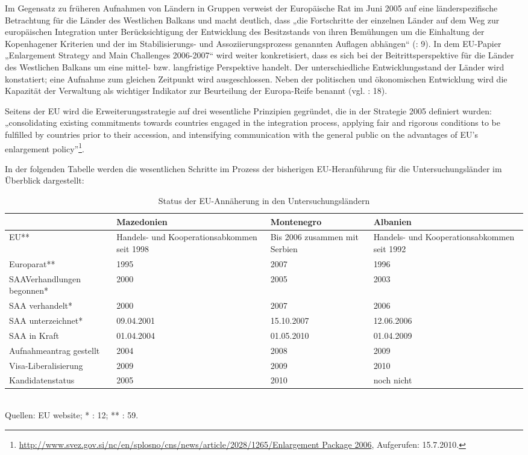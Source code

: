 Im Gegensatz zu früheren Aufnahmen von Ländern in Gruppen verweist der Europäische Rat im Juni 2005 auf eine länderspezifische Betrachtung für die Länder des Westlichen Balkans und macht deutlich, dass „die Fortschritte der einzelnen Länder auf dem Weg zur europäischen Integration unter Berücksichtigung der Entwicklung des Besitzstands von ihren Bemühungen um die Einhaltung der Kopenhagener Kriterien und der im Stabilisierungs- und Assoziierungsprozess genannten Auflagen abhängen“ (\cite{euko07}: 9). In dem EU-Papier „Enlargement Strategy and Main Challenges 2006-2007“ wird weiter konkretisiert, dass es sich bei der Beitrittsperspektive für die Länder des Westlichen Balkans um eine mittel- bzw. langfristige Perspektive handelt. Der unterschiedliche Entwicklungsstand der Länder wird konstatiert; eine Aufnahme zum gleichen Zeitpunkt wird ausgeschlossen. Neben der politischen und ökonomischen Entwicklung wird die Kapazität der Verwaltung als wichtiger Indikator zur Beurteilung der Europa-Reife benannt (vgl. \cite{eurcom06b}: 18).\par
Seitens der EU wird die Erweiterungsstrategie auf drei wesentliche Prinzipien gegründet, die in der Strategie 2005 definiert wurden: „consolidating existing commitments towards countries engaged in the integration process, applying fair and rigorous conditions to be fulfilled by countries prior to their accession, and intensifying communication with the general public on the advantages of EU’s enlargement policy”\footnote{\url{	http://www.svez.gov.si/nc/en/splosno/cns/news/article/2028/1265/Enlargement Package 2006}, Aufgerufen: 15.7.2010.}.\par

In der folgenden Tabelle werden die wesentlichen Schritte im Prozess der bisherigen EU-Heranführung für die Untersuchungsländer im Überblick dargestellt:
\begin{table}[H]
\caption{ Status der EU-Annäherung in den Untersuchungsländern}
\begin{tabular}{|L{ 3,5cm}|L{3,5cm}|L{3,5cm}|L{3,5cm}|}\hline
&Mazedonien&
Montenegro&
Albanien\\\hline
EU**&
Handels- und Koopera\-tions\-abkommen seit 1998&
Bis 2006 zusammen mit Serbien&
Handels- und Kooperations\-abkommen seit 1992\\\hline
Europarat**&
1995&
2007&
1996\\\hline
SAAVerhandlungen begonnen*&
2000&
2005&
2003\\\hline
SAA verhandelt*&
2000&
2007&
2006\\\hline
SAA unterzeichnet*&
09.04.2001&
15.10.2007&
12.06.2006\\\hline
SAA in Kraft&
01.04.2004&
01.05.2010&
01.04.2009\\\hline
Aufnahmeantrag gestellt&
2004&
2008&
2009\\\hline
Visa-Liberalisierung&
2009&
2009&
2010\\\hline
Kandidatenstatus&
2005&
2010&
noch nicht\\\hline
\end{tabular}\\

\scriptsize{Quellen: EU website; * \cite{mus}: 12; ** \cite{brusgal}: 59. }
\end{table}


